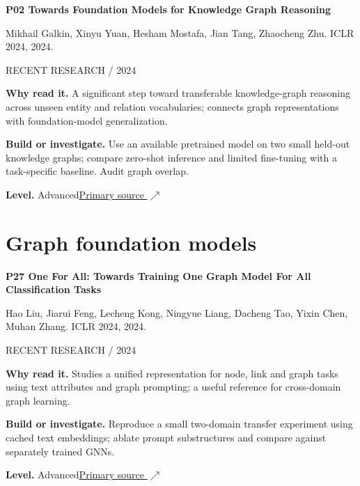 \documentclass[11pt,letterpaper]{article}
\begin{document}
\begin{minipage}{\linewidth}
{\large\bfseries P02 Towards Foundation Models for Knowledge Graph Reasoning}\par
Mikhail Galkin, Xinyu Yuan, Hesham Mostafa, Jian Tang, Zhaocheng Zhu. ICLR 2024, 2024.\par
\textcolor{ink}{\small RECENT RESEARCH / 2024}\par
\textbf{Why read it.} A significant step toward transferable knowledge-graph reasoning across unseen entity and relation vocabularies; connects graph representations with foundation-model generalization.\par
\textbf{Build or investigate.} Use an available pretrained model on two small held-out knowledge graphs; compare zero-shot inference and limited fine-tuning with a task-specific baseline. Audit graph overlap.\par
\textbf{Level.} Advanced\quad\href{https://proceedings.iclr.cc/paper_files/paper/2024/hash/85dd09d356ca561169b2c03e43cf305e-Abstract-Conference.html}{Primary source $\nearrow$}\par
\end{minipage}\par\vspace{10pt}
\section*{Graph foundation models}
\begin{minipage}{\linewidth}
{\large\bfseries P27 One For All: Towards Training One Graph Model For All Classification Tasks}\par
Hao Liu, Jiarui Feng, Lecheng Kong, Ningyue Liang, Dacheng Tao, Yixin Chen, Muhan Zhang. ICLR 2024, 2024.\par
\textcolor{ink}{\small RECENT RESEARCH / 2024}\par
\textbf{Why read it.} Studies a unified representation for node, link and graph tasks using text attributes and graph prompting; a useful reference for cross-domain graph learning.\par
\textbf{Build or investigate.} Reproduce a small two-domain transfer experiment using cached text embeddings; ablate prompt substructures and compare against separately trained GNNs.\par
\textbf{Level.} Advanced\quad\href{https://proceedings.iclr.cc/paper_files/paper/2024/hash/57faf5642eb06e0602b95f6aa989b38a-Abstract-Conference.html}{Primary source $\nearrow$}\par
\end{minipage}\par\vspace{10pt}
\end{document}
